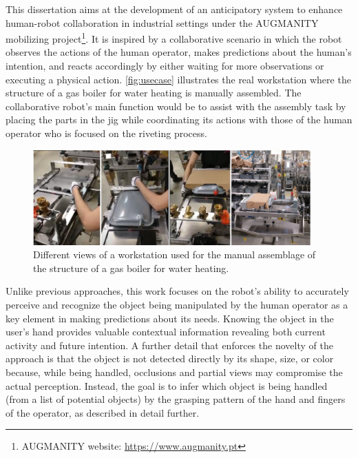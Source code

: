 This dissertation aims at the development of an anticipatory system to enhance human-robot collaboration in industrial settings under the AUGMANITY mobilizing project\footnote{AUGMANITY website: \url{https://www.augmanity.pt}}. It is inspired by a collaborative scenario in which the robot observes the actions of the human operator, makes predictions about the human’s intention, and reacts accordingly by either waiting for more observations or executing a physical action. \autoref{fig:usecase} illustrates the real workstation where the structure of a gas boiler for water heating is manually assembled. The collaborative robot’s main function would be to assist with the assembly task by placing the parts in the jig while coordinating its actions with those of the human operator who is focused on the riveting process.

\begin{figure}[ht]
\captionsetup{width=0.95\textwidth}
\centerline{\includegraphics[width=0.95\textwidth]{figs/usecase.jpg}}
\caption{Different views of a workstation used for the manual assemblage of the structure of a gas boiler for water heating.}
\label{fig:usecase}
\end{figure}

Unlike previous approaches, this work focuses on the robot’s ability to accurately perceive and recognize the object being manipulated by the human operator as a key element in making predictions about its needs. Knowing the object in the user’s hand provides valuable contextual information revealing both current activity and future intention. A further detail that enforces the novelty of the approach is that the object is not detected directly by its shape, size, or color because, while being handled, occlusions and partial views may compromise the actual perception. Instead, the goal is to infer which object is being handled (from a list of potential objects) by the grasping pattern of the hand and fingers of the operator, as described in detail further.

